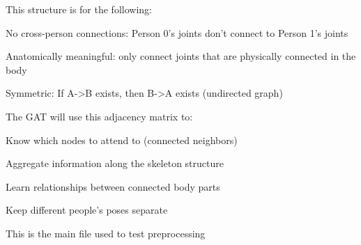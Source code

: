 This structure is for the following:
\begin{compactitem}
   \item No cross-person connections: Person 0's joints don't connect to Person 1's joints
   \item Anatomically meaningful: only connect joints that are physically connected in the body
   \item Symmetric: If A->B exists, then B->A exists (undirected graph)
\end{compactitem}

The GAT will use this adjacency matrix to:
\begin{compactitem}
   \item Know which nodes to attend to (connected neighbors)
   \item Aggregate information along the skeleton structure
   \item Learn relationships between connected body parts
   \item Keep different people's poses separate
\end{compactitem}

This is the main file used to test preprocessing


